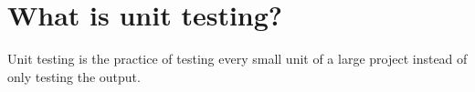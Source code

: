 \section{What is unit testing?}
Unit testing is the practice of testing every small unit of a large project instead of only testing the output.
